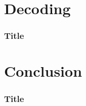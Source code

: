 \documentclass[handout,aspectratio=169]{beamer}
\begin{document}
\section[Decoding]{Decoding}

\begin{frame}
	\frametitle{Title}
		\begin{center}
	\end{center}
\end{frame} 


\section[Conclusion]{Conclusion}


\begin{frame}
	\frametitle{Title}
		\begin{center}
	\end{center}
\end{frame} 

\begin{frame}[plain]
\begin{columns}
\column{\dimexpr\paperwidth-10pt}
\end{columns}
\end{frame} 
\end{document}
